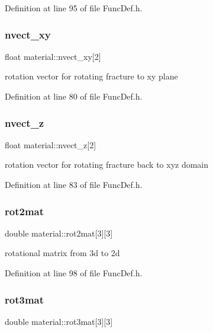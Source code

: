 Definition at line 95 of file Func\+Def.\+h.

\mbox{\label{structmaterial_a64fad3469b934d7e29be84f2d9b7d7a3}} 
\subsubsection{\texorpdfstring{nvect\_xy}{nvect\_xy}}
{\footnotesize\ttfamily float material\+::nvect\+\_\+xy\mbox{[}2\mbox{]}}

rotation vector for rotating fracture to xy plane 

Definition at line 80 of file Func\+Def.\+h.

\mbox{\label{structmaterial_aa0a097a3f8fe23d9b3bd41d80cbfacfd}} 
\subsubsection{\texorpdfstring{nvect\_z}{nvect\_z}}
{\footnotesize\ttfamily float material\+::nvect\+\_\+z\mbox{[}2\mbox{]}}

rotation vector for rotating fracture back to xyz domain 

Definition at line 83 of file Func\+Def.\+h.

\mbox{\label{structmaterial_a572b56f5488c560ee0fe118592b660a7}} 
\subsubsection{\texorpdfstring{rot2mat}{rot2mat}}
{\footnotesize\ttfamily double material\+::rot2mat\mbox{[}3\mbox{]}\mbox{[}3\mbox{]}}

rotational matrix from 3d to 2d 

Definition at line 98 of file Func\+Def.\+h.

\mbox{\label{structmaterial_a8df25744238b2b814530d49ad58f484d}} 
\subsubsection{\texorpdfstring{rot3mat}{rot3mat}}
{\footnotesize\ttfamily double material\+::rot3mat\mbox{[}3\mbox{]}\mbox{[}3\mbox{]}}


